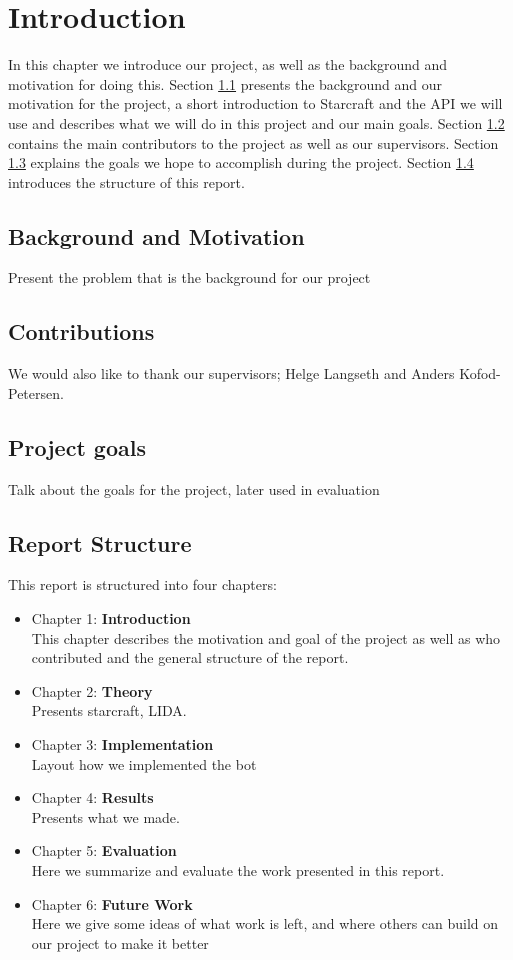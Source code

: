 
\chapter{Introduction}
In this chapter we introduce our project, as well as the background and
motivation for doing this. Section \ref{sec:background} presents the background
and our motivation for the project, a short introduction to Starcraft and the
API we will use and describes what we will do in this project and our main
goals. Section \ref{sec:contributions} contains the main contributors to the
project as well as our supervisors. Section \ref{sec:goals} explains the goals we hope to accomplish during the project. 
Section \ref{sec:structure} introduces the
structure of this report.

\section{Background and Motivation}
\label{sec:background}
Present the problem that is the background for our project


\section{Contributions}
\label{sec:contributions}
We would also like to thank our supervisors; Helge Langseth and Anders
Kofod-Petersen.

\section{Project goals}
\label{sec:goals}
Talk about the goals for the project, later used in evaluation

\section{Report Structure}
\label{sec:structure}
This report is structured into four chapters:
\begin{itemize}
\item Chapter 1: \textbf{Introduction} \\
This chapter describes the motivation and goal of the project as well as who
contributed and the general structure of the report.
\item Chapter 2: \textbf{Theory} \\
Presents starcraft, LIDA.
\item Chapter 3: \textbf{Implementation} \\
Layout how we implemented the bot 
\item Chapter 4: \textbf{Results} \\
Presents what we made.
\item Chapter 5: \textbf{Evaluation} \\
Here we summarize and evaluate the work presented in this report.
\item Chapter 6: \textbf{Future Work} \\
Here we give some ideas of what work is left, and where others can build on our project to make it better

\end{itemize}